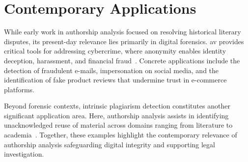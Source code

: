 \section{Contemporary Applications} %
\label{sec:digital_forensics}

While early work in authorship analysis focused on resolving historical literary disputes, its present-day relevance lies primarily in digital forensics. %
\ac{av} provides critical tools for addressing cybercrime, where anonymity enables identity deception, harassment, and financial fraud~\citep{abbasi_writeprints_2008,uchendu_authorship_2020,bhattacharjee_fighting_2024}. 
Concrete applications include the detection of fraudulent e-mails, impersonation on social media, and the identification of fake product reviews that undermine trust in e-commerce platforms. 

Beyond forensic contexts, intrinsic plagiarism detection constitutes another significant application area. 
Here, authorship analysis assists in identifying unacknowledged reuse of material across domains ranging from literature to academia~\citep{neal_surveying_2018}. 
Together, these examples highlight the contemporary relevance of authorship analysis safeguarding digital integrity and supporting legal investigation.
